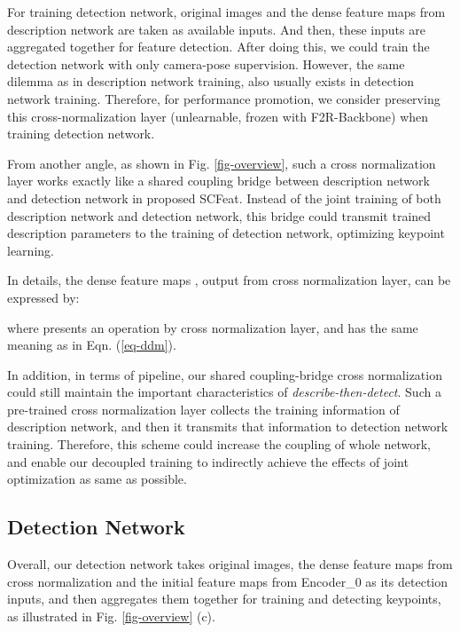 \documentclass[journal]{IEEEtran}
\begin{document}
For training detection network, original images and the dense feature maps from description network are taken as available inputs. And then, these inputs are aggregated together for feature detection. After doing this, we could train the detection network with only camera-pose supervision. However, the same dilemma as in description network training, also usually exists in detection network training. 
Therefore, for performance promotion, we consider preserving this cross-normalization layer (unlearnable, frozen with F2R-Backbone) when training detection network. 


From another angle, as shown in Fig. \ref{fig-overview}, such a cross normalization layer works exactly like a shared coupling bridge between description network and detection network in proposed SCFeat. 
Instead of the joint training of both description network and detection network, this bridge could transmit trained description parameters to the training of detection network, optimizing keypoint learning.

















In details, the dense feature maps , output from cross normalization layer, can be expressed by:

where  presents an operation by cross normalization layer, and  has the same meaning as in Eqn. (\ref{eq-ddm}). 

In addition, in terms of pipeline, our shared coupling-bridge cross normalization could still maintain the important characteristics of \emph{describe-then-detect}.
Such a pre-trained cross normalization layer collects the training information of description network, and then it transmits that information to detection network training. 
Therefore, this scheme could increase the coupling of whole network, and enable our decoupled training to indirectly achieve the effects of joint optimization as same as possible. 




\subsection{Detection Network} \label{detect}
Overall, our detection network takes original images, the dense feature maps from cross normalization and the initial feature maps from Encoder\_0 as its detection inputs, and then aggregates them together for 
training and detecting keypoints, as illustrated in Fig. \ref{fig-overview} (c). 
\end{document}
